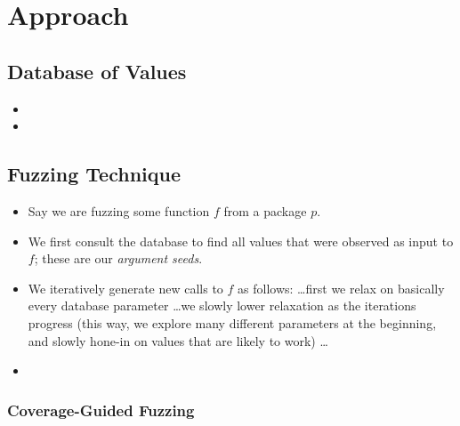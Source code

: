 \section{Approach}

\subsection{Database of Values}

\begin{itemize}
    \item {}
    \item {}
\end{itemize}

\subsection{Fuzzing Technique}

\begin{itemize}
    \item Say we are fuzzing some function $f$ from a package $p$.
    \item We first consult the database to find all values that were observed as input to $f$; these are our \textit{argument seeds}.
    \item We iteratively generate new calls to $f$ as follows: \ldots first we relax on basically every database parameter \ldots we slowly lower relaxation as the iterations progress (this way, we explore many different parameters at the beginning, and slowly hone-in on values that are likely to work) \ldots
    \item {}
\end{itemize}

\subsubsection{Coverage-Guided Fuzzing}

